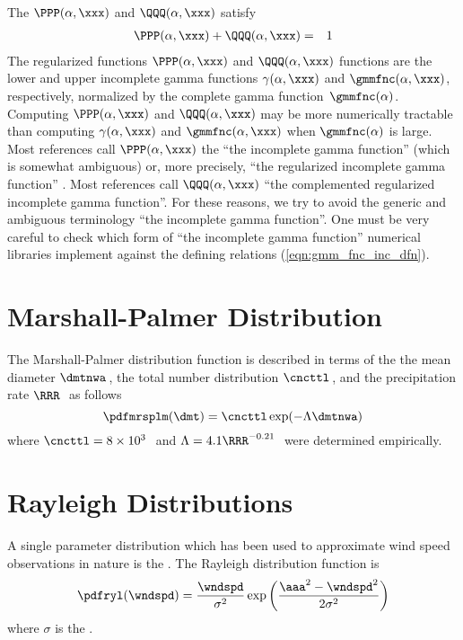 \documentclass[12pt,twoside]{book}
\begin{document}
The 
$\PPP(\alpha,\xxx)$ and $\QQQ(\alpha,\xxx)$ satisfy
\begin{eqnarray}
\PPP(\alpha,\xxx) + \QQQ(\alpha,\xxx) & = & 1
\label{eqn:gmm_fnc_rgl_dfn}
\end{eqnarray}
The regularized functions $\PPP(\alpha,\xxx)$ and $\QQQ(\alpha,\xxx)$
functions are the lower and upper incomplete gamma functions
$\gamma(\alpha,\xxx)$ and $\gmmfnc(\alpha,\xxx)$, respectively,
normalized by the complete gamma function~$\gmmfnc(\alpha)$.
Computing $\PPP(\alpha,\xxx)$ and $\QQQ(\alpha,\xxx)$ may be more
numerically tractable than computing $\gamma(\alpha,\xxx)$ and
$\gmmfnc(\alpha,\xxx)$ when $\gmmfnc(\alpha)$ is large.
Most references call $\PPP(\alpha,\xxx)$ the
``the incomplete gamma function'' (which is somewhat ambiguous) or, 
more precisely, ``the regularized incomplete gamma function''
\cite[e.g.,][]{AbS64,PTV96}.
Most references call $\QQQ(\alpha,\xxx)$ 
``the complemented regularized incomplete gamma function''.
For these reasons, we try to avoid the generic and ambiguous
terminology ``the incomplete gamma function''.
One must be very careful to check which form of ``the incomplete
gamma function'' numerical libraries implement against the defining
relations (\ref{eqn:gmm_fnc_inc_dfn}).

\section{Marshall-Palmer Distribution}\label{sxn:mrsplm}
The Marshall-Palmer distribution function is described in terms of the 
the mean diameter $\dmtnwa$\,\mm, the total number distribution
$\cncttl$\,\mCxmm, and the precipitation rate $\RRR$\,\mmxhr\ as follows 
\begin{equation}
\pdfmrsplm(\dmt) = \cncttl \exp (-\Lambda \dmtnwa)
\label{eqn:mrsplm_dst_dfn}
\end{equation}
where $\cncttl = 8 \times 10^{3}$\,\xmm\ and $\Lambda
= 4.1\RRR^{-0.21}$\,\xmm\ were determined empirically.  

\section{Rayleigh Distributions}\label{sxn:ryl}
A single parameter distribution which has been used to approximate
wind speed observations in nature is the .
The Rayleigh distribution function is 
\begin{equation}
\pdfryl(\wndspd) = \frac{\wndspd}{\sigma^{2}} 
\exp \left( \frac{\aaa^{2} - \wndspd^{2}}{2 \sigma^{2} } \right)
\label{eqn:ryl_dst_dfn}
\end{equation}
where $\sigma$ is the .
\end{document}
